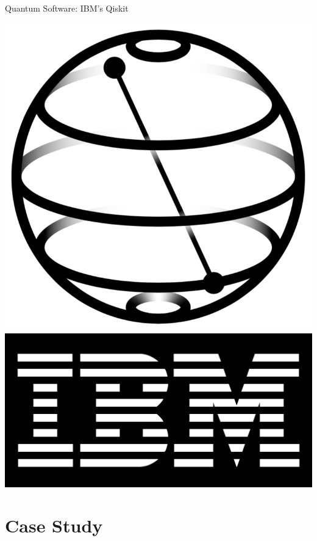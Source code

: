 \documentclass[9pt, handout, aspectratio=169]{beamer}		%
\begin{document}
\begin{frame}{Quantum Software: IBM's Qiskit}
\begin{multicols}{2}
			\begin{center}
				\includegraphics[height=.40\paperheight]{Figures/qiskit} \\
				\smallskip
				\includegraphics[width=.10\paperwidth]{Figures/ibm}
			\end{center}

		\end{multicols}

	\end{frame}


\section{Case Study}
\end{document}
